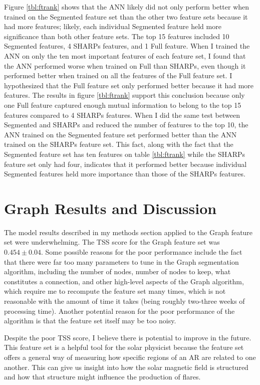 \documentclass[defaultstyle,11pt]{thesis}
\begin{document}
Figure \ref{tbl:ftrank} shows that the ANN likely did not only perform better when trained on the Segmented feature set than the other two feature sets because it had more features; likely, each individual Segmented feature held more significance than both other feature sets. The top 15 features included 10 Segmented features, 4 SHARPs features, and 1 Full feature. When I trained the ANN on only the ten most important features of each feature set, I found that the ANN performed worse when trained on Full than SHARPs, even though it performed better when trained on all the features of the Full feature set. I hypothesized that the Full feature set only performed better because it had more features. The results in figure \ref{tbl:ftrank} support this conclusion because only one Full feature captured enough mutual information to belong to the top 15 features compared to 4 SHARPs features. When I did the same test between Segmented and SHARPs and reduced the number of features to the top 10, the ANN trained on the Segmented feature set performed better than the ANN trained on the SHARPs feature set. This fact, along with the fact that the Segmented feature set has ten features on table \ref{tbl:ftrank} while the SHARPs feature set only had four, indicates that it performed better because individual Segmented features held more importance than those of the SHARPs features. 


\section{Graph Results and Discussion}

The model results described in my methods section applied to the Graph feature set were underwhelming. The TSS score for the Graph feature set was $0.454 \pm 0.04$. Some possible reasons for the poor performance include the fact that there were far too many parameters to tune in the Graph segmentation algorithm, including the number of nodes, number of nodes to keep, what constitutes a connection, and other high-level aspects of the Graph algorithm, which require me to recompute the feature set many times, which is not reasonable with the amount of time it takes (being roughly two-three weeks of processing time). Another potential reason for the poor performance of the algorithm is that the feature set itself may be too noisy. 

Despite the poor TSS score, I believe there is potential to improve in the future. This feature set is a helpful tool for the solar physicist because the feature set offers a general way of measuring how specific regions of an AR are related to one another. This can give us insight into how the solar magnetic field is structured and how that structure might influence the production of flares. 
\end{document}
